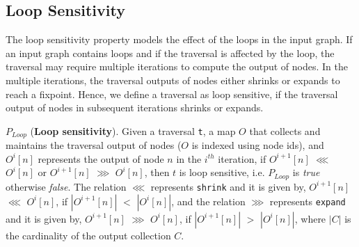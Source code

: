 \subsection{Loop Sensitivity}
The loop sensitivity property models the effect of the loops in the input graph.
If an input graph contains loops and if the traversal is affected by the loop,
the traversal may require multiple iterations to compute the output of nodes.
In the multiple iterations, the traversal outputs of nodes either shrinks or
expands to reach a fixpoint. Hence, we define a traversal as loop sensitive,
if the traversal output of nodes in subsequent iterations shrinks or expands.

\begin{definition}\label{def:loop-sensitivity}
$P_{Loop}$ (\textbf{Loop sensitivity}). Given a traversal \lstinline|t|, a map
$O$ that collects and maintains the traversal output of nodes ($O$ is indexed
using node ids), and $O^i[n]$ represents the output of node $n$ in the $i^{th}$
iteration, if $O^{i+1}[n]$ $\lll$ $O^{i}[n]$ or $O^{i+1}[n]$ $\ggg$ $O^{i}[n]$,
then $t$ is loop sensitive, i.e. $P_{Loop}$ is \textit{true} otherwise
\textit{false}.
The relation $\lll$ represents \lstinline|shrink| and it is given by,
$O^{i+1}[n]$ $\lll$ $O^{i}[n]$, if $|O^{i+1}[n]|$ $<$ $|O^{i}[n]|$, and the
relation $\ggg$ represents \lstinline|expand| and it is given by, $O^{i+1}[n]$
$\ggg$ $O^{i}[n]$, if $|O^{i+1}[n]|$ $>$ $|O^{i}[n]|$, where $|C|$ is the
cardinality of the output collection $C$.
\end{definition}

